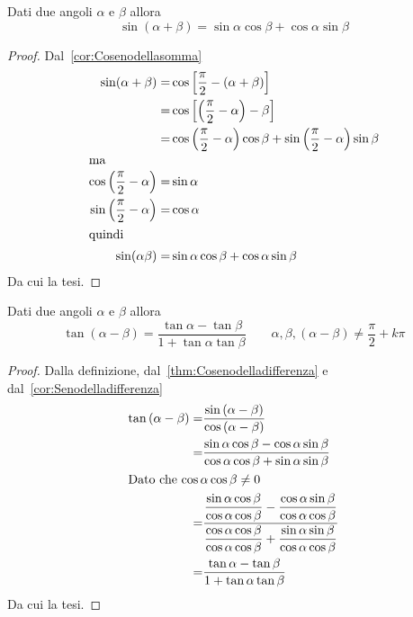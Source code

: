 \begin{cor}\label{cor:senosommaangoli}
	Dati due angoli $\alpha$ e $\beta$ allora
	\[\sin(\alpha+\beta)=\sin\alpha\cos\beta+\cos\alpha\sin\beta  \]
\end{cor}
\begin{proof}
	Dal~\vref{cor:Cosenodellasomma}
	\begin{align*}
	\sin(\alpha+\beta)=&\cos\left[\dfrac{\pi}{2}-\left(\alpha+\beta\right)\right]\\
	=&\cos\left[\left(\dfrac{\pi}{2}-\alpha\right)-\beta\right]\\
	=&\cos\left(\dfrac{\pi}{2}-\alpha\right)\cos\beta+\sin\left(\dfrac{\pi}{2}-\alpha\right)\sin\beta\\
	\intertext{ma}
	\cos\left(\dfrac{\pi}{2}-\alpha\right)=&\sin\alpha\\
	\sin\left(\dfrac{\pi}{2}-\alpha\right)=&\cos\alpha\\
	\intertext{quindi}
	\sin(\alpha\beta)=&\sin\alpha\cos\beta+\cos\alpha\sin\beta\\
	\end{align*}
	Da cui la tesi.
\end{proof}
\begin{thm}\label{thm:tangentedifferenza}
Dati due angoli $\alpha$ e $\beta$ allora\[\tan\left(\alpha-\beta\right)=\dfrac{\tan\alpha-\tan\beta}{1+\tan\alpha\tan\beta}\qquad\alpha,\beta,(\alpha-\beta)\neq\dfrac{\pi}{2}+k\pi\]
\end{thm}
\begin{proof}
	Dalla definizione, dal~\vref{thm:Cosenodelladifferenza} e dal~\vref{cor:Senodelladifferenza}
	\begin{align*}
	\tan\left(\alpha-\beta\right)=&\dfrac{\sin\left(\alpha-\beta\right)}{\cos\left(\alpha-\beta\right)}\\
	=&\dfrac{\sin\alpha\cos\beta-\cos\alpha\sin\beta}{\cos\alpha\cos\beta+\sin\alpha\sin\beta}\\
	\intertext{Dato che $\cos\alpha\cos\beta\neq 0$}
	=&\dfrac{\dfrac{\sin\alpha\cos\beta}{\cos\alpha\cos\beta}-\dfrac{\cos\alpha\sin\beta}{\cos\alpha\cos\beta}}{\dfrac{\cos\alpha\cos\beta}{\cos\alpha\cos\beta}+\dfrac{\sin\alpha\sin\beta}{\cos\alpha\cos\beta}}\\
	=&\dfrac{\tan\alpha-\tan\beta}{1+\tan\alpha\tan\beta}\\
	\end{align*}
	Da cui la tesi.
\end{proof}
